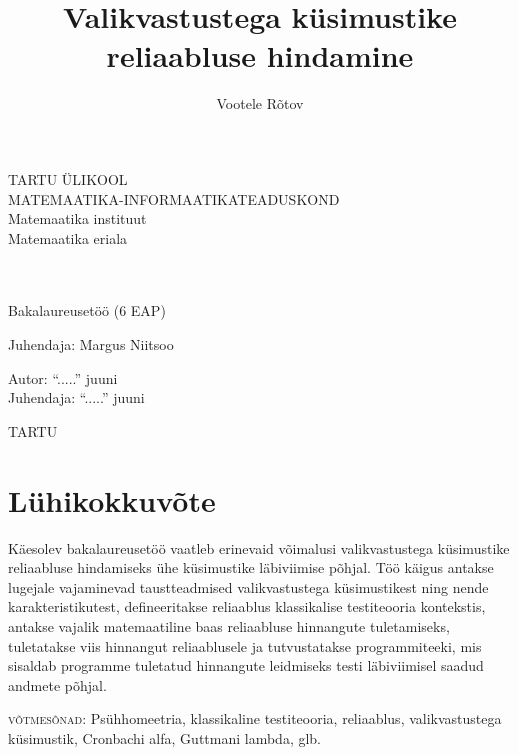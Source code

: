 \documentclass[a4paper,12pt,oneside]{article}
\author{Vootele Rõtov}
\title{Valikvastustega küsimustike reliaabluse hindamine}
\numberwithin{equation}{section}
\theoremstyle{definition}
\begin{document}
\makeatletter
\begin{titlepage}
\begin{center}

{\large TARTU ÜLIKOOL}\\[0.3cm]
{\large MATEMAATIKA-INFORMAATIKATEADUSKOND}\\[0.3cm]
{\large Matemaatika instituut}\\[0.3cm]
{\large Matemaatika eriala} %

\vfill
{\large \@author}\\[0.3cm]
{\huge \textbf{\@title}}\\[0.3cm]
{\large Bakalaureusetöö (6 EAP)} %

\vfill

\begin{flushright}
{\large Juhendaja: Margus Niitsoo}
\end{flushright}

\vfill

\begin{flushleft}
{\large
Autor: \dotfill ``.....'' juuni \the\year \\
Juhendaja: \dotfill ``.....'' juuni \the\year
}
\end{flushleft}

\vfill

{\large TARTU \the\year}

\end{center}
\end{titlepage}
\makeatother

\pagebreak


\section*{Lühikokkuvõte}
Käesolev bakalaureusetöö vaatleb erinevaid võimalusi valikvastustega küsimustike reliaabluse hindamiseks ühe küsimustike läbiviimise põhjal. Töö käigus antakse lugejale vajaminevad taustteadmised valikvastustega küsimustikest ning nende karakteristikutest, defineeritakse reliaablus klassikalise testiteooria kontekstis, antakse vajalik matemaatiline baas reliaabluse hinnangute tuletamiseks, tuletatakse viis hinnangut reliaablusele ja tutvustatakse programmiteeki, mis sisaldab programme tuletatud hinnangute leidmiseks testi läbiviimisel saadud andmete põhjal.

\textsc{võtmesõnad:} Psühhomeetria, klassikaline testiteooria,  reliaablus, valikvastustega küsimustik, Cronbachi alfa, Guttmani lambda, glb. 
\end{document}
